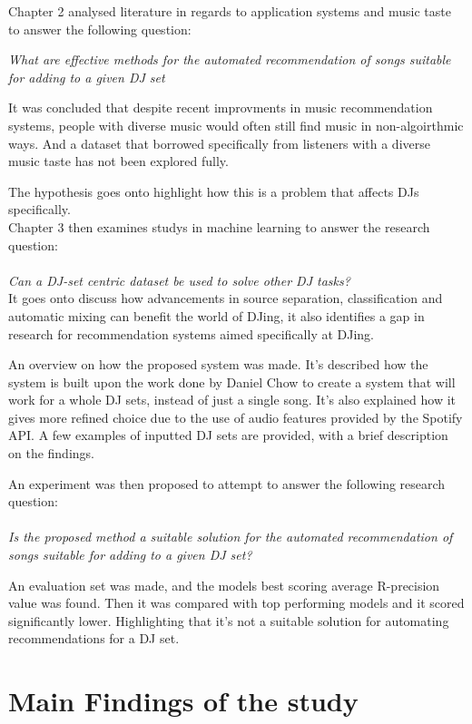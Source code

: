 Chapter 2 analysed literature in regards to application systems and music taste to answer the following question: 

\textit{What are effective methods for the automated recommendation of songs suitable
	for adding to a given DJ set}

It was concluded that despite recent improvments in music recommendation systems, people with diverse music would often still find music in non-algoirthmic ways. And a dataset that borrowed specifically from listeners with a diverse music taste has not been explored fully.

The hypothesis goes onto highlight how this  is a problem that affects DJs specifically.
\\

Chapter 3 then examines studys in machine learning to answer the research question:
\\
\\
\textit{Can a DJ-set centric dataset be used to solve other DJ tasks?}
\\
It goes onto discuss how advancements in source separation, classification and automatic mixing can benefit the world of DJing, it also identifies a gap in research for recommendation systems aimed specifically at DJing.

An overview on how the proposed system was made. It's described how the system is built upon the work done by Daniel Chow to create a system that will work for a whole DJ sets, instead of just a single song. It's also explained how it gives more refined choice due to the use of audio features provided by the Spotify API. A few examples of inputted DJ sets are provided, with a brief description on the findings. 

An experiment was then proposed to attempt to answer the following research question:
\\
\\
\textit{Is the proposed method a suitable solution for the automated recommendation of songs suitable for adding to a given DJ set?}

An evaluation set was made, and the models best scoring average R-precision value was found. Then it was compared with top performing models and it scored significantly lower. Highlighting that it's not a suitable solution for automating recommendations for a DJ set.

\section{Main Findings of the study}

